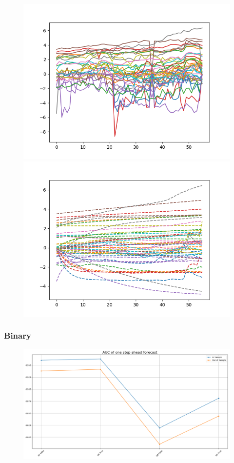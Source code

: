 \documentclass[a4paper,12pt]{article}
\begin{document}
\begin{figure}[h!]
	\includegraphics[width=0.95\linewidth 	]{./figures/SS_filter_WTN.png}\\
	\includegraphics[width=0.95\linewidth 	]{./figures/SD_filter_WTN.png}\\
\end{figure}
\subsubsection{Binary}
\begin{figure}[h!]
	\includegraphics[width=0.95\linewidth 	]{./figures/out_of_sample_auc_WTN_bin_rescaling.png}\\
\end{figure}
\end{document}
